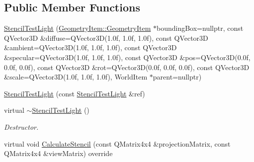 \subsection*{Public Member Functions}
\begin{DoxyCompactItemize}
\item 
\mbox{\hyperlink{class_geometry_engine_1_1_geometry_world_item_1_1_geometry_light_1_1_stencil_test_light_af2846d81fd5ca495ad936e6ebafd4772}{Stencil\+Test\+Light}} (\mbox{\hyperlink{class_geometry_engine_1_1_geometry_world_item_1_1_geometry_item_1_1_geometry_item}{Geometry\+Item\+::\+Geometry\+Item}} $\ast$bounding\+Box=nullptr, const Q\+Vector3D \&diffuse=Q\+Vector3D(1.\+0f, 1.\+0f, 1.\+0f), const Q\+Vector3\+D \&ambient=\+Q\+Vector3\+D(1.\+0f, 1.\+0f, 1.\+0f), const Q\+Vector3\+D \&specular=\+Q\+Vector3\+D(1.\+0f, 1.\+0f, 1.\+0f), const Q\+Vector3\+D \&pos=\+Q\+Vector3\+D(0.\+0f, 0.\+0f, 0.\+0f), const Q\+Vector3\+D \&rot=\+Q\+Vector3\+D(0.\+0f, 0.\+0f, 0.\+0f), const Q\+Vector3\+D \&scale=\+Q\+Vector3\+D(1.\+0f, 1.\+0f, 1.\+0f), World\+Item $\ast$parent=nullptr)
\item 
\mbox{\hyperlink{class_geometry_engine_1_1_geometry_world_item_1_1_geometry_light_1_1_stencil_test_light_a790e1319f7b03e4b2fb51352b7fe370e}{Stencil\+Test\+Light}} (const \mbox{\hyperlink{class_geometry_engine_1_1_geometry_world_item_1_1_geometry_light_1_1_stencil_test_light}{Stencil\+Test\+Light}} \&ref)
\item 
\mbox{\label{class_geometry_engine_1_1_geometry_world_item_1_1_geometry_light_1_1_stencil_test_light_add9ad2daf1dd851b0a473ce3d63f11d3}} 
virtual \mbox{\hyperlink{class_geometry_engine_1_1_geometry_world_item_1_1_geometry_light_1_1_stencil_test_light_add9ad2daf1dd851b0a473ce3d63f11d3}{$\sim$\+Stencil\+Test\+Light}} ()
\begin{DoxyCompactList}\small\item\em Destructor. \end{DoxyCompactList}\item 
virtual void \mbox{\hyperlink{class_geometry_engine_1_1_geometry_world_item_1_1_geometry_light_1_1_stencil_test_light_aa1d9d4bf4f47e6e55dbb1706a7e28697}{Calculate\+Stencil}} (const Q\+Matrix4x4 \&projection\+Matrix, const Q\+Matrix4x4 \&view\+Matrix) override
\item 
\mbox{\label{class_geometry_engine_1_1_geometry_world_item_1_1_geometry_light_1_1_stencil_test_light_ab25dbb6bfdeba423fcacfbae68effcdb}} 

\end{DoxyCompactItemize}
